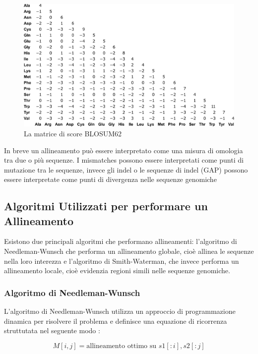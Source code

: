 \begin{figure}
    \centering
    \includegraphics[scale= 0.5]{images/BLOSUM62.png}
    \caption{La matrice di score \textsc{BLOSUM62}}
    \label{fig:blosum32}
\end{figure}

In breve un allineamento può essere interpretato come una misura di omologia tra due o più sequenze. I mismatches possono essere interpretati come punti di mutazione tra le sequenze, invece gli indel o le sequenze di indel (GAP) possono essere interpretate come punti di divergenza nelle sequenze genomiche 

\subsection{Algoritmi Utilizzati per performare un Allineamento}
Esistono due principali algoritmi che performano allineamenti:  l'algoritmo di Needleman-Wunsch che performa un allineamento globale, cioè allinea le sequenze nella loro interezza e l'algoritmo di Smith-Waterman, che invece performa un allineamento locale, cioè evidenzia regioni simili nelle sequenze genomiche.

\subsubsection{Algoritmo di Needleman-Wunsch}
L'algoritmo di Needleman-Wunsch utilizza un approccio di programmazione dinamica per risolvere il problema e definisce una equazione di ricorrenza struttutata nel seguente modo : 

\begin{equation*}
    M[i, j] = \textrm{allineamento  ottimo  su }  s1[:i],  s2[:j]
\end{equation*}

